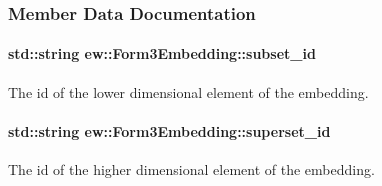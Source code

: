 \subsubsection{Member Data Documentation}
\hypertarget{classew_1_1Form3Embedding_a80d00799de7bebf48c00d6cd264a656e}{
\paragraph[{subset\_\-id}]{\setlength{\rightskip}{0pt plus 5cm}std::string {\bf ew::Form3Embedding::subset\_\-id}}\hfill}
\label{classew_1_1Form3Embedding_a80d00799de7bebf48c00d6cd264a656e}
The id of the lower dimensional element of the embedding. \hypertarget{classew_1_1Form3Embedding_a8aff0a6b37b54d177c15abfca9191f67}{
\paragraph[{superset\_\-id}]{\setlength{\rightskip}{0pt plus 5cm}std::string {\bf ew::Form3Embedding::superset\_\-id}}\hfill}
\label{classew_1_1Form3Embedding_a8aff0a6b37b54d177c15abfca9191f67}
The id of the higher dimensional element of the embedding. 